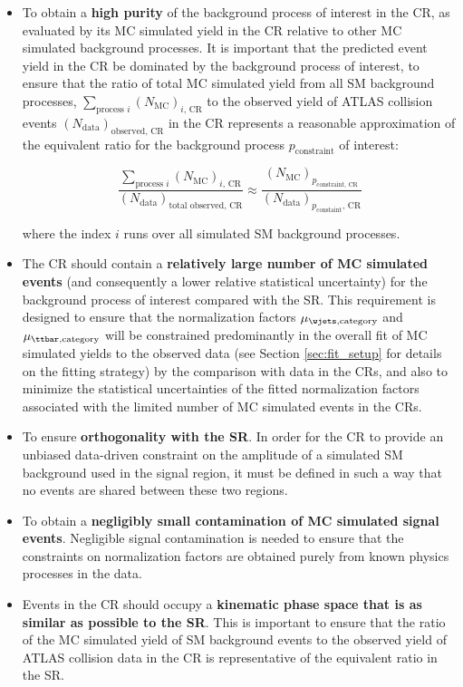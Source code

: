 \begin{itemize}
\item To obtain a \textbf{high purity} of the background process of interest in the CR, as evaluated by its MC simulated yield in the CR relative to other MC simulated background processes. It is important that the predicted event yield in the CR be dominated by the background process of interest, to ensure that the ratio of total MC simulated yield from all SM background processes, \(\sum\limits_{\text{process }i} (N_\text{MC})_{i\text{, CR}}\) to the observed yield of ATLAS collision events \((N_\text{data})_\text{observed, CR}\) in the CR represents a reasonable approximation of the equivalent ratio for the background process \(p_\text{constraint}\) of interest:

\begin{equation}
\label{eq:cr_ratio}
\frac{\sum\limits_{\text{process }i} (N_\text{MC})_{i\text{, CR}}}{(N_\text{data})_\text{total observed, CR}} \approx \frac{(N_\text{MC})_{p_{\text{constraint}\text{, CR}}}}{(N_\text{data})_{p_\text{constaint}\text{, CR}}}
\end{equation}

\noindent where the index \(i\) runs over all simulated SM background processes.

\item The CR should contain a \textbf{relatively large number of MC simulated events} (and consequently a lower relative statistical uncertainty) for the background process of interest compared with the SR. This requirement is designed to ensure that the normalization factors \(\mu_{\wjets, \text{category}}\) and \(\mu_{\ttbar, \text{category}}\) will be constrained predominantly in the overall fit of MC simulated yields to the observed data (see Section \ref{sec:fit_setup} for details on the fitting strategy) by the comparison with data in the CRs, and also to minimize the statistical uncertainties of the fitted normalization factors associated with the limited number of MC simulated events in the CRs. 
\item To ensure \textbf{orthogonality with the SR}. In order for the CR to provide an unbiased data-driven constraint on the amplitude of a simulated SM background used in the signal region, it must be defined in such a way that no events are shared between these two regions.
\item To obtain a \textbf{negligibly small contamination of MC simulated signal events}. Negligible signal contamination is needed to ensure that the constraints on normalization factors are obtained purely from known physics processes in the data.
\item Events in the CR should occupy a \textbf{kinematic phase space that is as similar as possible to the SR}. This is important to ensure that the ratio of the MC simulated yield of SM background events to the observed yield of ATLAS collision data in the CR is representative of the equivalent ratio in the SR.
\end{itemize}

